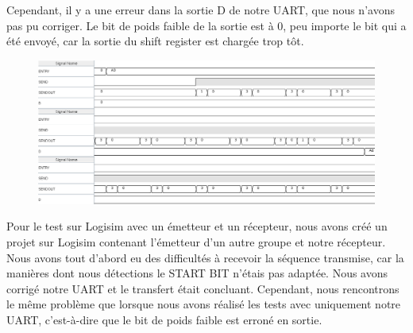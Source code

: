 \documentclass[a4paper]{article} %
\begin{document}
\begin{tcolorbox}[colframe=Monokaimagenta,colback=white]

Cependant, il y a une erreur dans la sortie D de notre UART, que nous n'avons pas pu corriger. Le bit de poids faible de la sortie est à 0, peu importe le bit qui a été envoyé, car la sortie du shift register est chargée trop tôt.\\
\begin{figure}[H]
\centering
    \includegraphics[width=1\textwidth]{src/CHRONO_EMISSION.png}
    \label{fig:chrono_emetteur}
\end{figure}
Pour le test sur Logisim avec un émetteur et un récepteur, nous avons créé un projet sur Logisim contenant l'émetteur d'un autre groupe et notre récepteur.\\
Nous avons tout d'abord eu des difficultés à recevoir la séquence transmise, car la manières dont nous détections le START BIT n'étais pas adaptée. Nous avons corrigé notre UART et le transfert était concluant. Cependant, nous rencontrons le même problème que lorsque nous avons réalisé les tests avec uniquement notre UART, c'est-à-dire que le bit de poids faible est erroné en sortie.
\end{tcolorbox}
\end{document}
